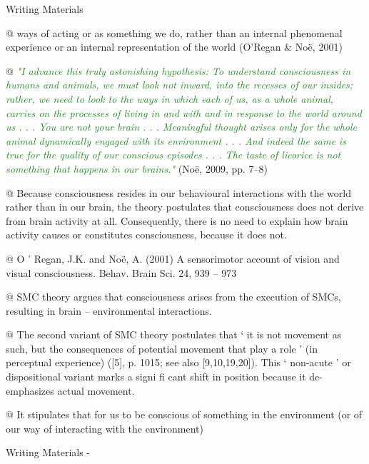 \documentclass[utf8]{article}
\newenvironment{WritingMaterials} %
    	{
            \begin{tcolorbox}[enhanced,
                title=-,
                size=small,
                colbacktitle=Aquamarine,
                drop fuzzy shadow,
                fontupper=\small,
                boxrule=0.4pt,
                colback=Aquamarine!10!white,
                sharp corners]
                Writing Materials
            \end{tcolorbox}
            \begin{easylist}[itemize]
    	}
    	{
            \end{easylist}  
            \begin{tcolorbox}[enhanced,
                halign=flush right,
                halign title=right,
                size=small,
                colbacktitle=Aquamarine,
                drop fuzzy shadow,
                fontupper=\small,
                boxrule=0.4pt,
                colback=Aquamarine,
                colupper=White,
                sharp corners]
                Writing Materials -
            \end{tcolorbox}        
    	}
\newcommand{\rewrite}[1]{\textcolor{ForestGreen}{\textit{"#1"}}\newline}
\begin{document}
\begin{WritingMaterials}
				@ ways of acting or as something we do, rather than an internal phenomenal experience or an internal representation of the world (O’Regan \& Noë, 2001)

				@ \rewrite{I advance this truly astonishing hypothesis: To understand consciousness in humans and animals, we must look not inward, into the recesses of our insides; rather, we need to look to the ways in which each of us, as a whole animal, carries on the processes of living in and with and in response to the world around us . . . You are not your brain . . . Meaningful thought arises only for the whole animal dynamically engaged with its environment . . . And indeed the same is true for the quality of our conscious episodes . . . The taste of licorice is not something that happens in our brains.} (Noë, 2009, pp. 7–8)

				@ Because consciousness resides in our behavioural interactions with the world rather than in our brain, the theory postulates that consciousness does not derive from brain activity at all. Consequently, there is no need to explain how brain activity causes or constitutes consciousness, because it does not.

				@ O ’ Regan, J.K. and Noë, A. (2001) A sensorimotor account of vision and visual consciousness. Behav. Brain Sci. 24, 939 – 973

				@ SMC theory argues that consciousness arises from the execution of SMCs, resulting in brain – environmental interactions.

				@ The second variant of SMC theory postulates that ‘ it is not movement as such, but the consequences of potential movement that play a role ’ (in perceptual experience) ([5], p. 1015; see also [9,10,19,20]). This ‘ non-acute ’ or dispositional variant marks a signi fi cant shift in position because it de-emphasizes actual movement. \cite{pennartz2017consciousness}

				@ It stipulates that for us to be conscious of something in the environment (or of our way of interacting with the environment)

			\end{WritingMaterials}
\end{document}
